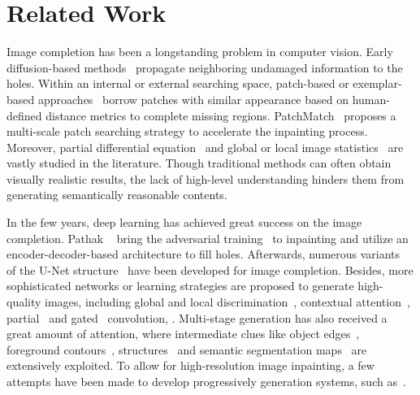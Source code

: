 \documentclass[10pt,twocolumn,letterpaper]{article}
\begin{document}
\section{Related Work}
	\label{sec:rela}
	
	Image completion has been a longstanding problem in computer vision. Early diffusion-based methods~\cite{bertalmio2000image, ballester2001filling} propagate neighboring undamaged information to the holes. Within an internal or external searching space, patch-based or exemplar-based approaches~\cite{hays2007scene,sun2005image,criminisi2004region,le2011examplar,criminisi2003object,ding2018image,lee2016laplacian} borrow patches with similar appearance based on human-defined distance metrics to complete missing regions. PatchMatch~\cite{barnes2009patchmatch} proposes a multi-scale patch searching strategy to accelerate the inpainting process. Moreover, partial differential equation~\cite{grossauer2004combined,bertalmio2006strong} and global or local image statistics~\cite{levin2003learning,ghorai2019multiple,fadili2009inpainting} are vastly studied in the literature. Though traditional methods can often obtain visually realistic results, the lack of high-level understanding hinders them from generating semantically reasonable contents.
	
	In the few years, deep learning has achieved great success on the image completion. Pathak \etal~\cite{pathak2016context} bring the adversarial training~\cite{goodfellow2014generative} to inpainting and utilize an encoder-decoder-based architecture to fill holes. Afterwards, numerous variants~\cite{yan2018shift,zeng2019learning,liu2020rethinking,wang2018image} of the U-Net structure~\cite{ronneberger2015u} have been developed for image completion. Besides, more sophisticated networks or learning strategies are proposed to generate high-quality images, including global and local discrimination~\cite{iizuka2017globally}, contextual attention~\cite{yu2018generative,liu2019coherent,xie2019image,yi2020contextual}, partial~\cite{liu2018image} and gated~\cite{yu2019free} convolution, \etc. Multi-stage generation has also received a great amount of attention, where intermediate clues like object edges~\cite{nazeri2019edgeconnect}, foreground contours~\cite{xiong2019foreground}, structures~\cite{ren2019structureflow} and semantic segmentation maps~\cite{song2018spg} are extensively exploited. To allow for high-resolution image inpainting, a few attempts have been made to develop progressively generation systems, such as~\cite{zhang2018semantic,guo2019progressive,li2020recurrent,zeng2020high,oh2019onion}.
	
\end{document}
